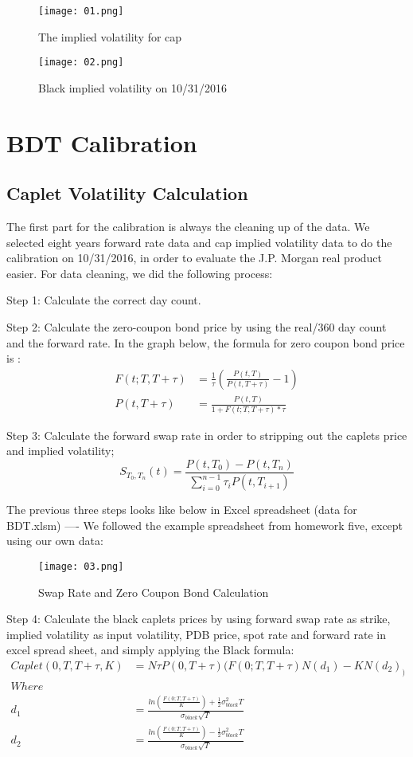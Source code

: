\documentclass[paper = letterpaper, fontsize=12pt]{article}
\begin{document}
\begin{figure}[H]
    \centering
    \texttt{[image: 01.png]}
        \caption{The implied volatility for cap}
\end{figure}

\begin{figure}[H]
    \centering
    \texttt{[image: 02.png]}
    \caption{Black implied volatility on 10/31/2016}
\end{figure}


\section{BDT Calibration}
\subsection{Caplet Volatility Calculation}

The first part for the calibration is always the cleaning up of the data. We selected eight years
forward rate data and cap implied volatility data to do the calibration on 10/31/2016, in order to evaluate the J.P. Morgan real product easier. For data cleaning, we did the following process:

Step 1: Calculate the correct day count.
	
Step 2: Calculate the zero-coupon bond price by using the real/360 day count and the forward rate. In the graph below, the formula for zero coupon bond price is :
\begin{align}
	F(t; T, T+\tau) &= \frac{1}{\tau}(\frac{P(t, T)}{P(t, T+\tau)} -1)\\
	P(t, T+\tau) &= \frac{P(t, T)}{1+F(t; T, T+\tau)*\tau}
\end{align}
	
 
Step 3: Calculate the forward swap rate in order to stripping out the caplets price and implied volatility;
\[
	S_{T_0, T_n}(t) = \frac{P(t, T_0) - P(t, T_n)}{\sum_{i=0}^{n-1}\tau_iP(t, T_{i+1})}
\] 

The previous three steps looks like below in Excel spreadsheet (data for BDT.xlsm) ---- We followed the example spreadsheet from homework five, except using our own data:
\begin{figure}[H]
    \centering
    \texttt{[image: 03.png]}
    \caption{Swap Rate and Zero Coupon Bond Calculation}
\end{figure}

	  
Step 4: Calculate the black caplets prices by using forward swap rate as strike, implied volatility as input volatility, PDB price, spot rate and forward rate in excel spread sheet, and simply applying the Black formula:
\begin{align*}
	Caplet(0, T, T+\tau, K) &= N\tau P(0, T+\tau)(F(0;T,T+\tau)N(d_1) - KN(d_2)_)\\
	Where\\
	d_1 &= \frac{ln(\frac{F(0;T,T+\tau)}{K}) + \frac{1}{2}\sigma_{black}^2T}{\sigma_{black} \sqrt{T}}\\
	d_2 &= \frac{ln(\frac{F(0;T,T+\tau)}{K}) - \frac{1}{2}\sigma_{black}^2T}{\sigma_{black} \sqrt{T}}
\end{align*}
\end{document}
